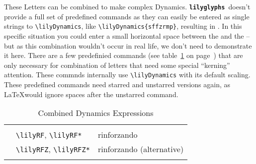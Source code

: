 \documentclass{article}
\newcommand{\lilyglyphs}{\texttt{\textbf{lilyglyphs\,}}}
\newcommand*{\cmd}[1]{\texttt{\textbackslash #1}}
\newcommand{\tmpCaption}{} %
\newcommand{\tmpLabel}{}
\newenvironment{reftable}[2]
	{%
		\renewcommand{\tmpCaption}{#1}
		\renewcommand{\tmpLabel}{#2}
		\begin{table}[ht]
		\begin{center}
		\begin{tabular}[t]{lll}
		\hline
		&\\
	}
	{%
		&\\
		\hline
		\end{tabular}
		\caption{\tmpCaption}
		\label{table:\tmpLabel}
		\end{center}
		\end{table}
	}
\begin{document}
These Letters can be combined to make complex Dynamics. 
\lilyglyphs doesn't provide a full set of predefined commands as they can easily be entered as single strings to \cmd{lilyDynamics}, like \cmd{lilyDynamics\{sffzrmp\}}, resulting in . 
In this specific situation you could enter a small horizontal space between the  and the  -- but as this combination wouldn't occur in real life, we don't need to demonstrate it here.
There are a few predefinied commands (see table~\ref{table:combinedDynLetters} on page~\pageref{table:combinedDynLetters}) that are only necessary for combination of letters that need some special \enquote{kerning} attention. These commnds internally use \cmd{lilyDynamics} with its default scaling. These predefined commands need starred and unstarred versions again, as \LaTeX would ignore spaces after the unstarred command.

\begin{reftable}{Combined Dynamics Expressions}{combinedDynLetters}
\lilyRF* & \cmd{lilyRF}, \cmd{lilyRF*} & rinforzando\\
\lilyRFZ* & \cmd{lilyRFZ}, \cmd{lilyRFZ*} & rinforzando (alternative)\\

\end{reftable}
\end{document}
